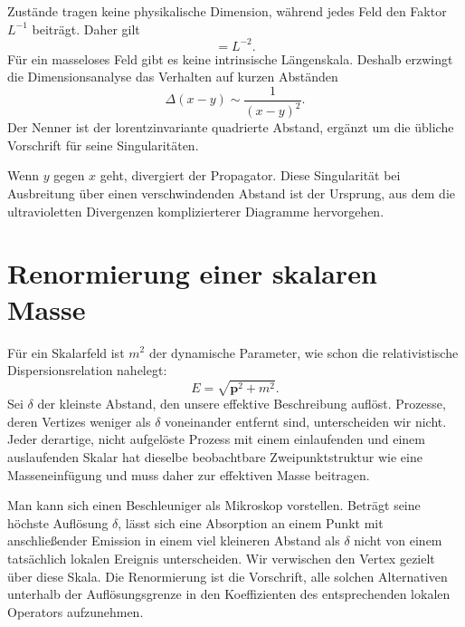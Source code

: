 Zustände tragen keine physikalische Dimension, während jedes Feld den Faktor \(L^{-1}\) beiträgt. Daher gilt \begin{equation}
[\Delta]=L^{-2}.
\end{equation}Für ein masseloses Feld gibt es keine intrinsische Längenskala. Deshalb erzwingt die Dimensionsanalyse das Verhalten auf kurzen Abständen \begin{equation}
\Delta(x-y)\sim\frac{1}{(x-y)^2}.
\label{eq:massless-propagator}
\end{equation}Der Nenner ist der lorentzinvariante quadrierte Abstand, ergänzt um die übliche Vorschrift für seine Singularitäten.

Wenn \(y\) gegen \(x\) geht, divergiert der Propagator. Diese Singularität bei Ausbreitung über einen verschwindenden Abstand ist der Ursprung, aus dem die ultravioletten Divergenzen komplizierterer Diagramme hervorgehen.

\section{Renormierung einer skalaren Masse}

Für ein Skalarfeld ist \(m^2\) der dynamische Parameter, wie schon die relativistische Dispersionsrelation nahelegt: \begin{equation}
E=\sqrt{\mathbf p^2+m^2}.
\end{equation}Sei \(\delta\) der kleinste Abstand, den unsere effektive Beschreibung auflöst. Prozesse, deren Vertizes weniger als \(\delta\) voneinander entfernt sind, unterscheiden wir nicht. Jeder derartige, nicht aufgelöste Prozess mit einem einlaufenden und einem auslaufenden Skalar hat dieselbe beobachtbare Zweipunktstruktur wie eine Masseneinfügung und muss daher zur effektiven Masse beitragen.

Man kann sich einen Beschleuniger als Mikroskop vorstellen. Beträgt seine höchste Auflösung \(\delta\), lässt sich eine Absorption an einem Punkt mit anschließender Emission in einem viel kleineren Abstand als \(\delta\) nicht von einem tatsächlich lokalen Ereignis unterscheiden. Wir verwischen den Vertex gezielt über diese Skala. Die Renormierung ist die Vorschrift, alle solchen Alternativen unterhalb der Auflösungsgrenze in den Koeffizienten des entsprechenden lokalen Operators aufzunehmen.

